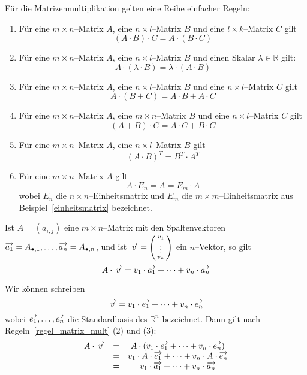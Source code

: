 \bigbreak

Für die Matrizenmultiplikation gelten eine Reihe einfacher Regeln:

\begin{regel}\label{regel_matrix_mult} 

\begin{enumerate} 
\item Für eine $m \times n$--Matrix $A$, eine $n \times l$--Matrix $B$ und eine $l \times 
k$--Matrix $C$ gilt
  	$$ (A \cdot B) \cdot C = A \cdot (B \cdot C) $$
\item Für eine  $m \times n$--Matrix $A$, eine $n \times l$--Matrix $B$ und einen Skalar $\lambda 
\in \mathbb R$ gilt:
  	$$ A \cdot (\lambda \cdot B) = \lambda \cdot (A \cdot B) $$
\item Für eine $m \times n$--Matrix $A$, eine $n \times l$--Matrix $B$ und eine $n \times 
l$--Matrix $C$ gilt
  	$$ A \cdot ( B + C ) = A \cdot B + A \cdot C $$
\item Für eine $m \times n$--Matrix $A$, eine $m \times n$--Matrix $B$ und eine $n \times 
l$--Matrix $C$ gilt
  	$$ (A + B)\cdot C = A \cdot C + B \cdot C $$
\item Für eine $m \times n$--Matrix $A$, eine $n \times l$--Matrix $B$ gilt
  	$$ (A \cdot B)^T = B^T \cdot A^T $$
\item Für eine $m \times n$--Matrix $A$ gilt
  	$$ A \cdot E_n = A = E_m \cdot A $$
wobei $E_n$ die $n \times n$--Einheitsmatrix und $E_m$ die $m \times m$--Einheitsmatrix aus 
Beispiel~\ref{einheitsmatrix} bezeichnet.
\end{enumerate}
\end{regel}  

\begin{korollar}\label{matrix_mult_spalten} 
Ist $A = \left( a_{i,j} \right)$ eine $m \times n$--Matrix mit den
Spaltenvektoren $\overrightarrow{a_1} = A_{\bullet,1}, \ldots,  
\overrightarrow{a_n} = A_{\bullet, n}$, und ist $\overrightarrow{v} = 
\left( \begin{smallmatrix} v_1 \\ \vdots \\ v_n \end{smallmatrix} \right)$ ein 
$n$--Vektor, so gilt
  	$$ A \cdot \overrightarrow{v} = v_1 \cdot \overrightarrow{a_1} + \cdots + v_n \cdot \overrightarrow{a_n} $$
\end{korollar}

\beweis Wir können schreiben
  	$$ \overrightarrow{v} = v_1 \cdot \overrightarrow{e_1} + \cdots + 
     	v_n \cdot \overrightarrow{e_n} $$
wobei $\overrightarrow{e_1}, \ldots , \overrightarrow{e_n}$ die Standardbasis des 
$\mathbb R^n$ bezeichnet. Dann gilt nach Regeln~\ref{regel_matrix_mult} (2) und (3):
  	$$ \begin{array} {l c c}
  	A \cdot \overrightarrow{v} & = & A \cdot \left( v_1 \cdot \overrightarrow{e_1} + 
	\cdots + v_n \cdot \overrightarrow{e_n} \right) \\
  	& = & v_1 \cdot A \cdot \overrightarrow{e_1} + \cdots + 
   	v_n \cdot A \cdot \overrightarrow{e_n} \\
  	& = & v_1 \cdot \overrightarrow{a_1} + \cdots + 
	v_n \cdot \overrightarrow{a_n}
  	\end{array} $$

